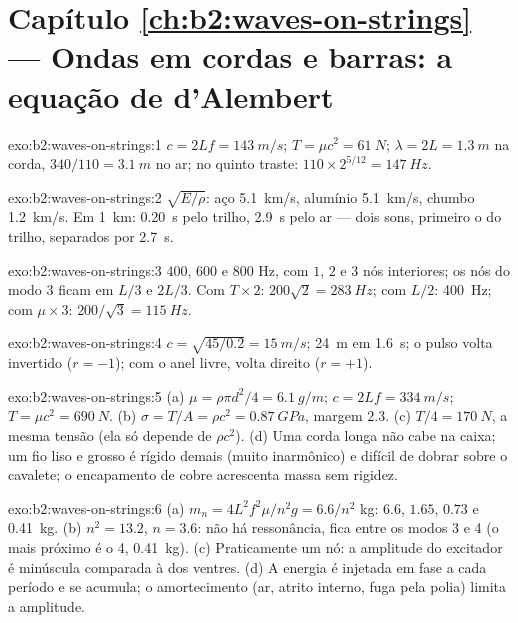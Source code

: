 \section*{Capítulo \ref{ch:b2:waves-on-strings} --- Ondas em cordas e barras: a equação de d'Alembert}

\begin{solution}{exo:b2:waves-on-strings:1}
$c = 2Lf = \qty{143}{m/s}$; $T = \mu c^2 = \qty{61}{N}$; $\lambda = 2L = \qty{1.3}{m}$ na
corda, $340/110 = \qty{3.1}{m}$ no ar; no quinto traste: $110 \times 2^{5/12} =
\qty{147}{Hz}$.
\end{solution}

\begin{solution}{exo:b2:waves-on-strings:2}
$\sqrt{E/\rho}$: aço \qty{5.1}{km/s}, alumínio \qty{5.1}{km/s}, chumbo
\qty{1.2}{km/s}. Em \qty{1}{km}: \qty{0.20}{s} pelo trilho, \qty{2.9}{s} pelo ar ---
dois sons, primeiro o do trilho, separados por \qty{2.7}{s}.
\end{solution}

\begin{solution}{exo:b2:waves-on-strings:3}
$400$, $600$ e $800$ Hz, com $1$, $2$ e $3$ nós interiores; os nós do modo 3 ficam em
$L/3$ e $2L/3$. Com $T \times 2$: $200\sqrt2 = \qty{283}{Hz}$; com $L/2$: \qty{400}{Hz}; com $\mu
\times 3$: $200/\sqrt3 = \qty{115}{Hz}$.
\end{solution}

\begin{solution}{exo:b2:waves-on-strings:4}
$c = \sqrt{45/0.2} = \qty{15}{m/s}$; \qty{24}{m} em \qty{1.6}{s}; o pulso volta
invertido ($r = -1$); com o anel livre, volta direito ($r = +1$).
\end{solution}

\begin{solution}{exo:b2:waves-on-strings:5}
(a) $\mu = \rho\pi d^2/4 = \qty{6.1}{g/m}$; $c = 2Lf = \qty{334}{m/s}$; $T = \mu c^2 =
\qty{690}{N}$. (b) $\sigma = T/A = \rho c^2 = \qty{0.87}{GPa}$, margem $2.3$. (c) $T/4 =
\qty{170}{N}$, a mesma tensão (ela só depende de $\rho c^2$). (d) Uma corda
longa não cabe na caixa; um fio liso e grosso é rígido demais (muito
inarmônico) e difícil de dobrar sobre o cavalete; o encapamento de cobre acrescenta massa
sem rigidez.
\end{solution}

\begin{solution}{exo:b2:waves-on-strings:6}
(a) $m_n = 4L^2f^2\mu/n^2g = 6.6/n^2$ kg: $6.6$, $1.65$, $0.73$ e \qty{0.41}{kg}. (b)
$n^2 = 13.2$, $n = 3.6$: não há ressonância, fica entre os modos 3 e 4 (o mais próximo é o 4,
\qty{0.41}{kg}). (c) Praticamente um nó: a amplitude do excitador é minúscula
comparada à dos ventres. (d) A energia é injetada em fase a cada período e
se acumula; o amortecimento (ar, atrito interno, fuga pela
polia) limita a amplitude.
\end{solution}

